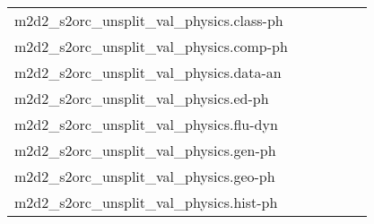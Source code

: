 {\begin{longtable}{m{6cm}m{1.7cm}m{1.7cm}m{1.7cm}m{1.7cm}m{1.7cm}}
	m2d2\_s2orc\_unsplit\_val\_physics.class-ph  & \colorbox[HTML]{9fd688}{\makebox[\mywidth][c]{11.01}} & \colorbox[HTML]{e7f5ad}{\makebox[\mywidth][c]{11.27}} & \colorbox[HTML]{ffffe5}{\makebox[\mywidth][c]{12.85}} & \colorbox[HTML]{c8e89a}{\makebox[\mywidth][c]{11.12}} & \colorbox[HTML]{77c578}{\makebox[\mywidth][c]{10.94}}\\
	m2d2\_s2orc\_unsplit\_val\_physics.comp-ph  & \colorbox[HTML]{bfe596}{\makebox[\mywidth][c]{11.23}} & \colorbox[HTML]{e3f4aa}{\makebox[\mywidth][c]{11.37}} & \colorbox[HTML]{ffffe5}{\makebox[\mywidth][c]{12.88}} & \colorbox[HTML]{c8e89a}{\makebox[\mywidth][c]{11.26}} & \colorbox[HTML]{77c578}{\makebox[\mywidth][c]{11.08}}\\
	m2d2\_s2orc\_unsplit\_val\_physics.data-an  & \colorbox[HTML]{c3e698}{\makebox[\mywidth][c]{13.18}} & \colorbox[HTML]{e5f4ab}{\makebox[\mywidth][c]{13.33}} & \colorbox[HTML]{ffffe5}{\makebox[\mywidth][c]{14.97}} & \colorbox[HTML]{d7efa2}{\makebox[\mywidth][c]{13.25}} & \colorbox[HTML]{77c578}{\makebox[\mywidth][c]{13.00}}\\
	m2d2\_s2orc\_unsplit\_val\_physics.ed-ph  & \colorbox[HTML]{c8e89a}{\makebox[\mywidth][c]{12.21}} & \colorbox[HTML]{e3f4aa}{\makebox[\mywidth][c]{12.33}} & \colorbox[HTML]{ffffe5}{\makebox[\mywidth][c]{13.88}} & \colorbox[HTML]{bee496}{\makebox[\mywidth][c]{12.18}} & \colorbox[HTML]{77c578}{\makebox[\mywidth][c]{12.03}}\\
	m2d2\_s2orc\_unsplit\_val\_physics.flu-dyn  & \colorbox[HTML]{bee496}{\makebox[\mywidth][c]{11.81}} & \colorbox[HTML]{e5f4ab}{\makebox[\mywidth][c]{11.99}} & \colorbox[HTML]{ffffe5}{\makebox[\mywidth][c]{13.73}} & \colorbox[HTML]{bee496}{\makebox[\mywidth][c]{11.81}} & \colorbox[HTML]{77c578}{\makebox[\mywidth][c]{11.64}}\\
	m2d2\_s2orc\_unsplit\_val\_physics.gen-ph  & \colorbox[HTML]{a4d98a}{\makebox[\mywidth][c]{14.15}} & \colorbox[HTML]{daf0a4}{\makebox[\mywidth][c]{14.39}} & \colorbox[HTML]{ffffe5}{\makebox[\mywidth][c]{16.76}} & \colorbox[HTML]{acdc8d}{\makebox[\mywidth][c]{14.18}} & \colorbox[HTML]{77c578}{\makebox[\mywidth][c]{14.03}}\\
	m2d2\_s2orc\_unsplit\_val\_physics.geo-ph  & \colorbox[HTML]{bde395}{\makebox[\mywidth][c]{14.75}} & \colorbox[HTML]{d8efa2}{\makebox[\mywidth][c]{14.86}} & \colorbox[HTML]{ffffe5}{\makebox[\mywidth][c]{16.81}} & \colorbox[HTML]{b3df91}{\makebox[\mywidth][c]{14.71}} & \colorbox[HTML]{77c578}{\makebox[\mywidth][c]{14.57}}\\
	m2d2\_s2orc\_unsplit\_val\_physics.hist-ph  & \colorbox[HTML]{f2fab5}{\makebox[\mywidth][c]{15.57}} & \colorbox[HTML]{dcf1a5}{\makebox[\mywidth][c]{15.43}} & \colorbox[HTML]{ffffe5}{\makebox[\mywidth][c]{16.97}} & \colorbox[HTML]{d5eea1}{\makebox[\mywidth][c]{15.40}} & \colorbox[HTML]{77c578}{\makebox[\mywidth][c]{15.18}}\\

\end{longtable}}
